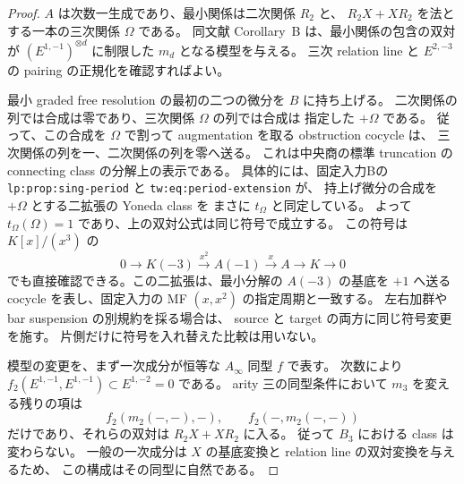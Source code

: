\begin{proof}
$A$ は次数一生成であり、最小関係は二次関係 $R_2$ と、
$R_2X+XR_2$ を法とする一本の三次関係 $\Omega$ である。
同文献 Corollary~B は、最小関係の包含の双対が
$(E^{1,-1})^{\otimes d}$ に制限した $m_d$ となる模型を与える。
三次 relation line と $E^{2,-3}$ の pairing の正規化を確認すればよい。

最小 graded free resolution の最初の二つの微分を $B$ に持ち上げる。
二次関係の列では合成は零であり、三次関係 $\Omega$ の列では合成は
指定した $+\Omega$ である。
従って、この合成を $\Omega$ で割って augmentation を取る obstruction cocycle は、
三次関係の列を一、二次関係の列を零へ送る。
これは中央商の標準 truncation の connecting class の分解上の表示である。
具体的には、固定入力Bの
\texttt{lp:prop:sing-period} と \texttt{tw:eq:period-extension} が、
持上げ微分の合成を $+\Omega$ とする二拡張の Yoneda class を
まさに $t_\Omega$ と同定している。
よって $t_\Omega(\Omega)=1$ であり、上の双対公式は同じ符号で成立する。
この符号は $K[x]/(x^3)$ の
\[
 0\longrightarrow K(-3)\xrightarrow{x^2}
 A(-1)\xrightarrow{x}A\longrightarrow K\longrightarrow0
\]
でも直接確認できる。この二拡張は、最小分解の $A(-3)$ の基底を
$+1$ へ送る cocycle を表し、固定入力の MF $(x,x^2)$ の指定周期と一致する。
左右加群や bar suspension の別規約を採る場合は、
source と target の両方に同じ符号変更を施す。
片側だけに符号を入れ替えた比較は用いない。

模型の変更を、まず一次成分が恒等な $A_\infty$ 同型 $f$ で表す。
次数により $f_2(E^{1,-1},E^{1,-1})\subset E^{1,-2}=0$ である。
arity 三の同型条件において $m_3$ を変える残りの項は
\[
 f_2(m_2(-,-),-),\qquad f_2(-,m_2(-,-))
\]
だけであり、それらの双対は $R_2X+XR_2$ に入る。
従って $B_3$ における class は変わらない。
一般の一次成分は $X$ の基底変換と relation line の双対変換を与えるため、
この構成はその同型に自然である。
\end{proof}

